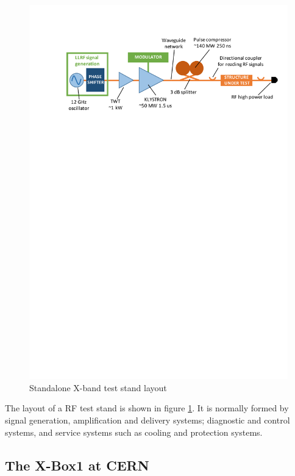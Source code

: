 \begin{figure}[h]
\centering 
\includegraphics[scale=0.8]{pictures/test_stand_scheme.pdf}
\caption{Standalone X-band test stand layout}
\label{xbox_layout}
\end{figure}

The layout of a RF test stand is shown in figure \ref{xbox_layout}. It is normally formed by signal generation, amplification and delivery systems; diagnostic and control systems, and service systems such as cooling and protection systems. 


\subsection[The X-Box1 at CERN]{The X-Box1 at CERN}

